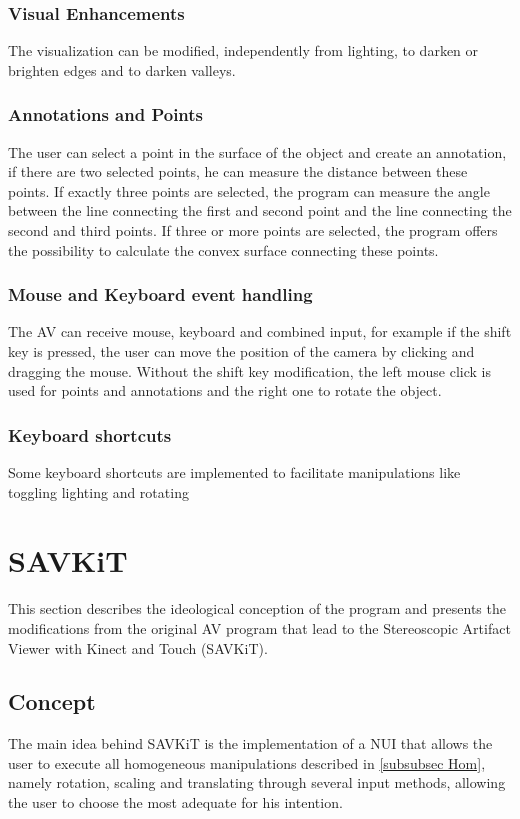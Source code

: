 \documentclass[12pt]{extarticle}
\begin{document}
	\subsubsection { Visual Enhancements}
	The visualization can be modified, independently from lighting, to darken or brighten edges and to darken valleys.
	\subsubsection { Annotations and Points}
	The user can select a point in the surface of the object and create an annotation, if there are two selected points, he can measure the distance between these points. If exactly three points are selected, the program can measure the angle between the line connecting the first and second point and the line connecting the second and third points.
	If three or more points are selected, the program offers the possibility to calculate the convex surface connecting these points.
	\subsubsection { Mouse and Keyboard event handling}
	The AV can receive mouse, keyboard and combined input, for example if the shift key is pressed, the user can move the position of the camera by clicking and dragging the mouse. Without the shift key modification, the left mouse click is used for points and annotations and the right one to rotate the object.
	\subsubsection { Keyboard shortcuts}
	Some keyboard shortcuts are implemented to facilitate manipulations like toggling lighting and rotating
	
\section{SAVKiT}\label{sec:Sav}
This section describes the ideological conception of the program and presents the modifications from the original AV program that lead to the Stereoscopic Artifact Viewer with Kinect and Touch (SAVKiT).

\subsection {Concept}
The main idea behind SAVKiT is the implementation of a NUI that allows the user to execute all homogeneous manipulations described in \ref{subsubsec Hom}, namely rotation, scaling and translating through several input methods, allowing the user to choose the most adequate for his intention.
\end{document}
